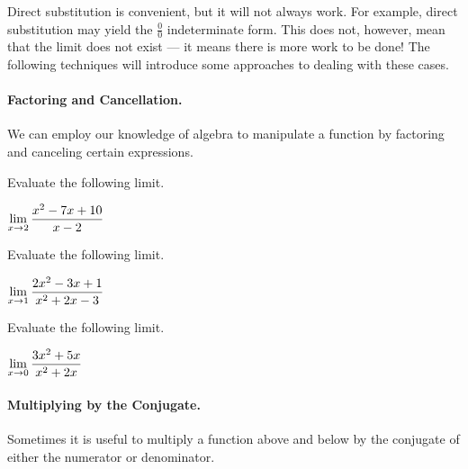 \documentclass[12pt]{article}
\begin{document}
\vspace{25mm}

\newpage

Direct substitution is convenient, but it will not always work. For example, direct substitution may yield the $\frac{0}{0}$ indeterminate form. This does not, however, mean that the limit does not exist --- it means there is more work to be done! The following techniques will introduce some approaches to dealing with these cases.

\vspace{5mm}

\paragraph{Factoring and Cancellation.} We can employ our knowledge of algebra to manipulate a function by factoring and canceling certain expressions.

\Example Evaluate the following limit.

\vspace{5mm}

\hspace{10mm} $\displaystyle\lim_{x\to 2}\frac{x^2-7x+10}{x-2}$

\vspace{34mm}

\Example Evaluate the following limit.

\vspace{5mm}

\hspace{10mm} $\displaystyle\lim_{x\to 1}\frac{2x^2-3x+1}{x^2+2x-3}$

\vspace{34mm}

\Example Evaluate the following limit.

\vspace{5mm}

\hspace{10mm} $\displaystyle\lim_{x\to 0}\frac{3x^2+5x}{x^2+2x}$

\vspace{34mm}

\newpage

\paragraph{Multiplying by the Conjugate.} Sometimes it is useful to multiply a function above and below by the conjugate of either the numerator or denominator.
\end{document}
